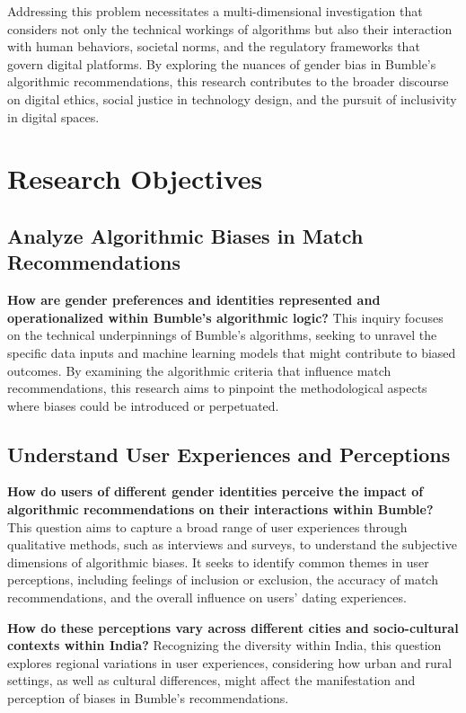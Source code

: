 Addressing this problem necessitates a multi-dimensional investigation that considers not only the technical workings of algorithms but also their interaction with human behaviors, societal norms, and the regulatory frameworks that govern digital platforms. By exploring the nuances of gender bias in Bumble’s algorithmic recommendations, this research contributes to the broader discourse on digital ethics, social justice in technology design, and the pursuit of inclusivity in digital spaces.

\section{Research Objectives}
\subsection{Analyze Algorithmic Biases in Match Recommendations}
\textbf{How are gender preferences and identities represented and operationalized within Bumble's algorithmic logic?}
This inquiry focuses on the technical underpinnings of Bumble’s algorithms, seeking to unravel the specific data inputs and machine learning models that might contribute to biased outcomes. By examining the algorithmic criteria that influence match recommendations, this research aims to pinpoint the methodological aspects where biases could be introduced or perpetuated.

\subsection{Understand User Experiences and Perceptions}
\textbf{How do users of different gender identities perceive the impact of algorithmic recommendations on their interactions within Bumble?}
This question aims to capture a broad range of user experiences through qualitative methods, such as interviews and surveys, to understand the subjective dimensions of algorithmic biases. It seeks to identify common themes in user perceptions, including feelings of inclusion or exclusion, the accuracy of match recommendations, and the overall influence on users’ dating experiences.

\textbf{How do these perceptions vary across different cities and socio-cultural contexts within India?}
Recognizing the diversity within India, this question explores regional variations in user experiences, considering how urban and rural settings, as well as cultural differences, might affect the manifestation and perception of biases in Bumble’s recommendations.


